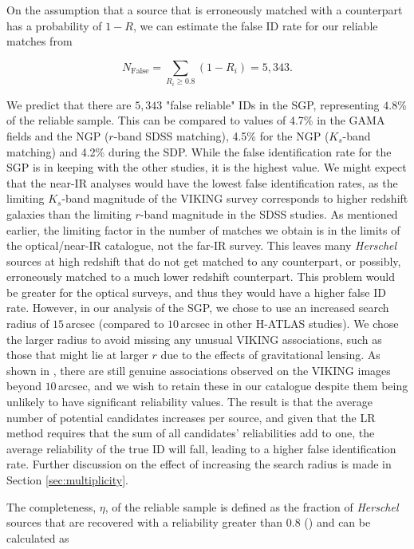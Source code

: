 On the assumption that a source that is erroneously matched with a counterpart has a probability of $1 - R$, we can estimate the false ID rate for our reliable matches from

\begin{equation}
    N_{\textrm{False}} = \sum_{R_i \geq 0.8} (1 - R_i) = 5,343.
\label{eq:false_ids}
\end{equation}

We predict that there are $5,343$ "false reliable" IDs in the SGP, representing $4.8\%$ of the reliable sample. This can be compared to values of 4.7\% in the GAMA fields and the NGP ($r$-band SDSS matching), 4.5\% for the NGP ($K_s$-band matching) and 4.2\% during the SDP. While the false identification rate for the SGP is in keeping with the other studies, it is the highest value. We might expect that the near-IR analyses would have the lowest false identification rates, as the limiting $K_s$-band magnitude of the VIKING survey corresponds to higher redshift galaxies than the limiting $r$-band magnitude in the SDSS studies. As mentioned earlier, the limiting factor in the number of matches we obtain is in the limits of the optical/near-IR catalogue, not the far-IR survey. This leaves many \textit{Herschel} sources at high redshift that do not get matched to any counterpart, or possibly, erroneously matched to a much lower redshift counterpart. This problem would be greater for the optical surveys, and thus they would have a higher false ID rate. However, in our analysis of the SGP, we chose to use an increased search radius of $15\,$arcsec (compared to $10\,$arcsec in other H-ATLAS studies). We chose the larger radius to avoid missing any unusual VIKING associations, such as those that might lie at larger $r$ due to the effects of gravitational lensing. As shown in \citealt{Bakx_2020}, there are still genuine associations observed on the VIKING images beyond $10\,$arcsec, and we wish to retain these in our catalogue despite them being unlikely to have significant reliability values. The result is that the average number of potential candidates increases per source, and given that the LR method requires that the sum of all candidates' reliabilities add to one, the average reliability of the true ID will fall, leading to a higher false identification rate. Further discussion on the effect of increasing the search radius is made in Section \ref{sec:multiplicity}.

The completeness, $\eta$, of the reliable sample is defined as the fraction of \textit{Herschel} sources that are recovered with a reliability greater than $0.8$ (\citealt{Smith_2011}) and can be calculated as

